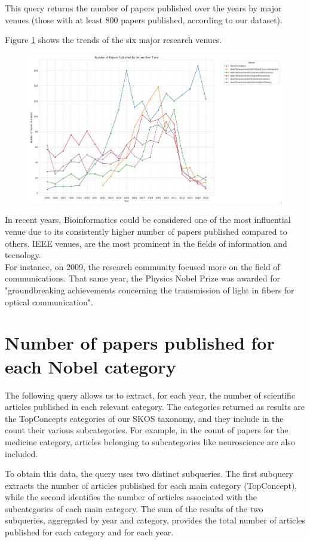 \documentclass{article}
\begin{document}
This query returns the number of papers published over the years by major
venues (those with at least 800 papers published, according to our dataset).

Figure \ref{fig:papersPerVenue} shows the trends of the six major research venues.

\begin{figure}[H]
	\centering
	\label{fig:papersPerVenue}
	\includegraphics[width=\textwidth]{../queries/plots/papersPerVenue.png}
\end{figure}

In recent years, Bioinformatics could be considered one of the most influential
venue due to its consistently higher number of papers published compared to others.
IEEE venues, are the most prominent in the fields of information and tecnology.\\
For instance, on 2009, the research community focused more on the field of
communications.
That same year, the Physics Nobel Prize was awarded for "groundbreaking achievements
concerning the transmission of light in fibers for optical communication".

\section{Number of papers published for each Nobel category}
The following query allows us to extract, for each year, the number of scientific articles published in each relevant category. The categories returned
as results are the TopConcepts categories of our SKOS taxonomy, and they include in the count their various subcategories. For example, in the count
of papers for the medicine category, articles belonging to subcategories like neuroscience are also included.

\noindent To obtain this data, the query uses two distinct subqueries. The first subquery extracts the number of articles published for each main category
(TopConcept), while the second identifies the number of articles associated with the subcategories of each main category. The sum of the results of
the two subqueries, aggregated by year and category, provides the total number of articles published for each category and for each year.
\end{document}
